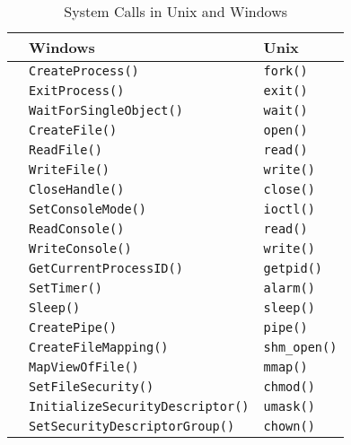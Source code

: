 \begin{table}[h!tbp]
  \centering
  \begin{tabular}{lll}
    \toprule
    & \textbf{Windows} & \textbf{Unix} \\
    \midrule
    \nameref{subsubsec:Process_Control} & \texttt{CreateProcess()} & \texttt{fork()} \\
    & \texttt{ExitProcess()} & \texttt{exit()} \\
    & \texttt{WaitForSingleObject()} & \texttt{wait()} \\
    \midrule
    \nameref{subsubsec:File_Manipulation} & \texttt{CreateFile()} & \texttt{open()} \\
    & \texttt{ReadFile()} & \texttt{read()} \\
    & \texttt{WriteFile()} & \texttt{write()} \\
    & \texttt{CloseHandle()} & \texttt{close()} \\
    \midrule
    \nameref{subsubsec:Device_Manipulation} & \texttt{SetConsoleMode()} & \texttt{ioctl()} \\
    & \texttt{ReadConsole()} & \texttt{read()} \\
    & \texttt{WriteConsole()} & \texttt{write()} \\
    \midrule
    \nameref{subsubsec:Information_Maintenance} & \texttt{GetCurrentProcessID()} & \texttt{getpid()} \\
    & \texttt{SetTimer()} & \texttt{alarm()} \\
    & \texttt{Sleep()} & \texttt{sleep()} \\
    \midrule
    \nameref{subsubsec:Communications} & \texttt{CreatePipe()} & \texttt{pipe()} \\
    & \texttt{CreateFileMapping()} & \texttt{shm_open()} \\
    & \texttt{MapViewOfFile()} & \texttt{mmap()} \\
    \midrule
    \nameref{subsubsec:Protection} & \texttt{SetFileSecurity()} & \texttt{chmod()} \\
    & \texttt{InitializeSecurityDescriptor()} & \texttt{umask()} \\
    & \texttt{SetSecurityDescriptorGroup()} & \texttt{chown()} \\
    \bottomrule
  \end{tabular}
  \caption{System Calls in Unix and Windows}
  \label{tab:System_Calls_Examples}
\end{table}

